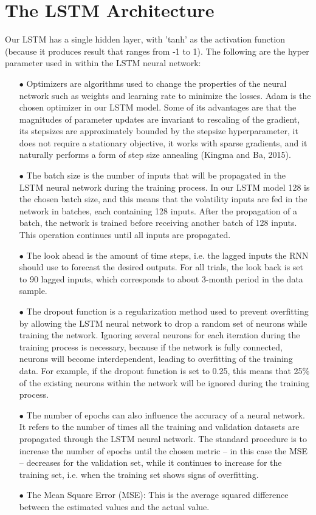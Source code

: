 \documentclass[a4paper,11pt,oneside]{book}
\begin{document}
\section{The LSTM Architecture}
Our LSTM has a single hidden layer,  with 'tanh' as the activation function (because it produces result that ranges from -1 to 1). The following are the hyper parameter used in within the LSTM neural network:
\begin{itemize}

\item[$\bullet$]   
Optimizers are algorithms used to change the properties of the neural network such as weights and learning rate to minimize the losses. Adam is the chosen optimizer in our LSTM model. Some of its advantages are that the magnitudes of parameter updates are invariant to
rescaling of the gradient, its stepsizes are approximately bounded by the stepsize hyperparameter,
it does not require a stationary objective, it works with sparse gradients, and it naturally performs a
form of step size annealing (Kingma and Ba, 2015).
\item[$\bullet$] The batch size is the number of inputs that will be propagated in the
LSTM neural network during the training process. In our LSTM model 128 is the chosen batch size, and this means that the volatility inputs are
fed in the network in batches, each containing 128 inputs. After
the propagation of a batch, the network is trained before receiving another
batch of 128 inputs. This operation continues until all inputs are propagated.
\item[$\bullet$] The look ahead is the amount of time steps, i.e. the lagged
inputs the RNN should use to forecast the desired outputs. For all trials, the look back is set to 90 lagged inputs, which
corresponds to about 3-month period in the data sample.
\item[$\bullet$] The dropout function is a regularization method used to prevent overfitting by
allowing the LSTM neural network to drop a random set of neurons while
training the network. Ignoring several neurons for each iteration during the
training process is necessary, because if the network is fully connected,
neurons will become interdependent, leading to overfitting of the training data. For example, if the dropout function is set to 0.25, this means that 25\% of the existing
neurons within the network will be ignored during the training process.
\item[$\bullet$] The number of epochs can also influence the accuracy of a neural network. It
refers to the number of times all the training and validation datasets are
propagated through the LSTM neural network. The standard procedure is to
increase the number of epochs until the chosen metric – in this case the MSE
– decreases for the validation set, while it continues to increase for the training
set, i.e. when the training set shows signs of overfitting.
\item[$\bullet$] The Mean Square Error (MSE): This is the average squared difference between the estimated values and the actual value.


\end{itemize}
\end{document}
